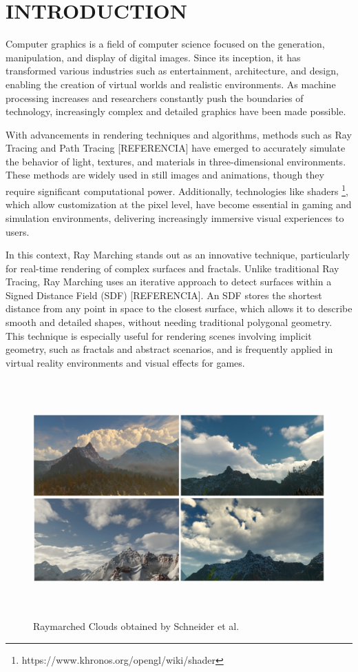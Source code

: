 \chapter{INTRODUCTION}\label{chp:LABEL_CHP_1}


Computer graphics is a field of computer science focused on the generation, manipulation, and display of digital images. Since its inception, it has transformed various industries such as entertainment, architecture, and design, enabling the creation of virtual worlds and realistic environments. As machine processing increases and researchers constantly push the boundaries of technology, increasingly complex and detailed graphics have been made possible.


With advancements in rendering techniques and algorithms, methods such as Ray Tracing and Path Tracing [REFERENCIA] have emerged to accurately simulate the behavior of light, textures, and materials in three-dimensional environments. These methods are widely used in still images and animations, though they require significant computational power. Additionally, technologies like shaders \footnote{https://www.khronos.org/opengl/wiki/shader}, which allow customization at the pixel level, have become essential in gaming and simulation environments, delivering increasingly immersive visual experiences to users.


In this context, Ray Marching stands out as an innovative technique, particularly for real-time rendering of complex surfaces and fractals. Unlike traditional Ray Tracing, Ray Marching uses an iterative approach to detect surfaces within a Signed Distance Field (SDF) [REFERENCIA]. An SDF stores the shortest distance from any point in space to the closest surface, which allows it to describe smooth and detailed shapes, without needing traditional polygonal geometry. This technique is especially useful for rendering scenes involving implicit geometry, such as fractals and abstract scenarios, and is frequently applied in virtual reality environments and visual effects for games.


\begin{figure}[ht]
    \centering
    \includegraphics[width=13.83cm,height=9.1cm]{imagens/raymarched-clouds-schneider.png} 
    \caption{Raymarched Clouds obtained by Schneider et al.\protect\footnotemark}
    \label{fig:internet}
\end{figure}

